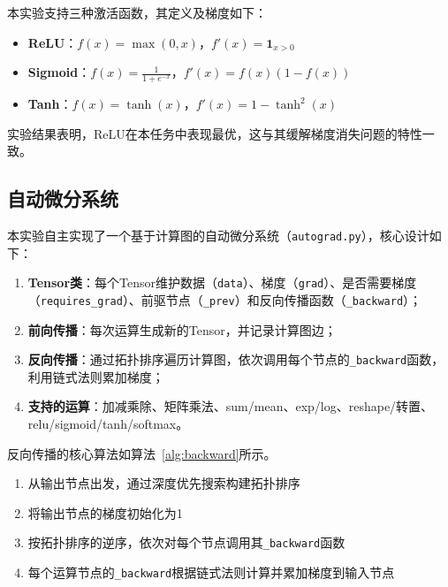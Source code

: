 \documentclass[12pt,a4paper]{article}
\begin{document}
本实验支持三种激活函数，其定义及梯度如下：

\begin{itemize}[leftmargin=2em]
    \item \textbf{ReLU}：$f(x) = \max(0, x)$，$f'(x) = \mathbf{1}_{x>0}$
    \item \textbf{Sigmoid}：$f(x) = \frac{1}{1+e^{-x}}$，$f'(x) = f(x)(1-f(x))$
    \item \textbf{Tanh}：$f(x) = \tanh(x)$，$f'(x) = 1 - \tanh^2(x)$
\end{itemize}

实验结果表明，ReLU在本任务中表现最优，这与其缓解梯度消失问题的特性一致。

\subsection{自动微分系统}

本实验自主实现了一个基于计算图的自动微分系统（\texttt{autograd.py}），核心设计如下：

\begin{enumerate}[leftmargin=2em]
    \item \textbf{Tensor类}：每个Tensor维护数据（\texttt{data}）、梯度（\texttt{grad}）、是否需要梯度（\texttt{requires\_grad}）、前驱节点（\texttt{\_prev}）和反向传播函数（\texttt{\_backward}）；
    \item \textbf{前向传播}：每次运算生成新的Tensor，并记录计算图边；
    \item \textbf{反向传播}：通过拓扑排序遍历计算图，依次调用每个节点的\texttt{\_backward}函数，利用链式法则累加梯度；
    \item \textbf{支持的运算}：加减乘除、矩阵乘法、sum/mean、exp/log、reshape/转置、relu/sigmoid/tanh/softmax。
\end{enumerate}

反向传播的核心算法如算法~\ref{alg:backward}所示。

\begin{algorithm}[H]
\caption{自动微分反向传播算法}\label{alg:backward}
\begin{enumerate}[leftmargin=2em]
    \item 从输出节点出发，通过深度优先搜索构建拓扑排序
    \item 将输出节点的梯度初始化为1
    \item 按拓扑排序的逆序，依次对每个节点调用其\texttt{\_backward}函数
    \item 每个运算节点的\texttt{\_backward}根据链式法则计算并累加梯度到输入节点
\end{enumerate}
\end{algorithm}
\end{document}

